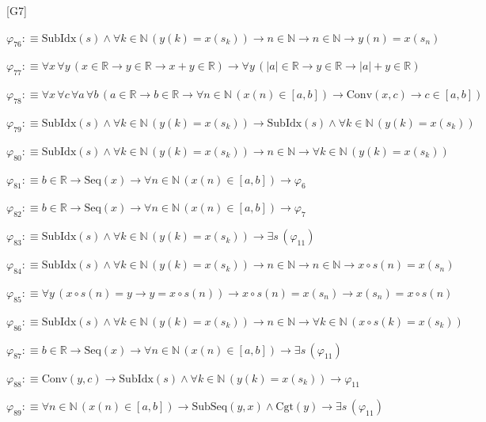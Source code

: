 \begin{fullproof}{[G7]}
\begin{abbrevlist}
\item $\varphi_{76} :\equiv \mathrm{SubIdx}(s) \land \forall k \in \mathbb{N}\,(y(k) = x(s_{k})) \to n \in \mathbb{N} \to n \in \mathbb{N} \to y(n) = x(s_{n})$
\item $\varphi_{77} :\equiv \forall x\,\forall y\,(x \in \mathbb{R} \to y \in \mathbb{R} \to x + y \in \mathbb{R}) \to \forall y\,(\lvert a \rvert \in \mathbb{R} \to y \in \mathbb{R} \to \lvert a \rvert + y \in \mathbb{R})$
\item $\varphi_{78} :\equiv \forall x\,\forall c\,\forall a\,\forall b\,(a \in \mathbb{R} \to b \in \mathbb{R} \to \forall n \in \mathbb{N}\,(x(n) \in [a,b]) \to \mathrm{Conv}(x,c) \to c \in [a,b])$
\item $\varphi_{79} :\equiv \mathrm{SubIdx}(s) \land \forall k \in \mathbb{N}\,(y(k) = x(s_{k})) \to \mathrm{SubIdx}(s) \land \forall k \in \mathbb{N}\,(y(k) = x(s_{k}))$
\item $\varphi_{80} :\equiv \mathrm{SubIdx}(s) \land \forall k \in \mathbb{N}\,(y(k) = x(s_{k})) \to n \in \mathbb{N} \to \forall k \in \mathbb{N}\,(y(k) = x(s_{k}))$
\item $\varphi_{81} :\equiv b \in \mathbb{R} \to \mathrm{Seq}(x) \to \forall n \in \mathbb{N}\,(x(n) \in [a,b]) \to \varphi_{6}$
\item $\varphi_{82} :\equiv b \in \mathbb{R} \to \mathrm{Seq}(x) \to \forall n \in \mathbb{N}\,(x(n) \in [a,b]) \to \varphi_{7}$
\item $\varphi_{83} :\equiv \mathrm{SubIdx}(s) \land \forall k \in \mathbb{N}\,(y(k) = x(s_{k})) \to \exists s\,(\varphi_{11})$
\item $\varphi_{84} :\equiv \mathrm{SubIdx}(s) \land \forall k \in \mathbb{N}\,(y(k) = x(s_{k})) \to n \in \mathbb{N} \to n \in \mathbb{N} \to x \circ s(n) = x(s_{n})$
\item $\varphi_{85} :\equiv \forall y\,(x \circ s(n) = y \to y = x \circ s(n)) \to x \circ s(n) = x(s_{n}) \to x(s_{n}) = x \circ s(n)$
\item $\varphi_{86} :\equiv \mathrm{SubIdx}(s) \land \forall k \in \mathbb{N}\,(y(k) = x(s_{k})) \to n \in \mathbb{N} \to \forall k \in \mathbb{N}\,(x \circ s(k) = x(s_{k}))$
\item $\varphi_{87} :\equiv b \in \mathbb{R} \to \mathrm{Seq}(x) \to \forall n \in \mathbb{N}\,(x(n) \in [a,b]) \to \exists s\,(\varphi_{11})$
\item $\varphi_{88} :\equiv \mathrm{Conv}(y,c) \to \mathrm{SubIdx}(s) \land \forall k \in \mathbb{N}\,(y(k) = x(s_{k})) \to \varphi_{11}$
\item $\varphi_{89} :\equiv \forall n \in \mathbb{N}\,(x(n) \in [a,b]) \to \mathrm{SubSeq}(y,x) \land \mathrm{Cgt}(y) \to \exists s\,(\varphi_{11})$

\end{abbrevlist}
\end{fullproof}

